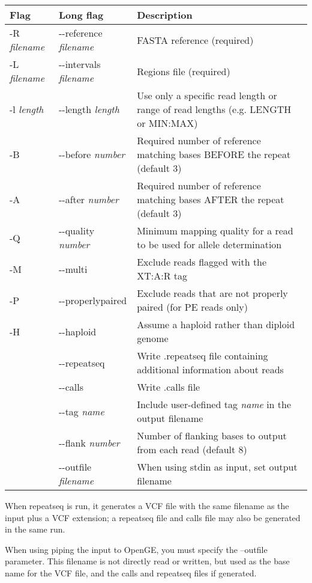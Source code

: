 \documentclass[11pt]{article}
\begin{document}
\begin{center}
\begin{tabular}{llp{3.5in}}
\hline
Flag&Long flag&Description\\ \hline
 -R \textit{filename}&{-}{-}reference \textit{filename}&FASTA reference (required)\\
 -L \textit{filename}&{-}{-}intervals \textit{filename}&Regions file (required)\\
 -l \textit{length}&{-}{-}length \textit{length}&Use only a specific read length or range of read lengths (e.g. LENGTH or MIN:MAX)\\
 -B&{-}{-}before \textit{number}&Required number of reference matching bases BEFORE the repeat (default 3)\\
 -A&{-}{-}after \textit{number}&Required number of reference matching bases AFTER the repeat (default 3)\\
 -Q&{-}{-}quality \textit{number}&Minimum mapping quality for a read to be used for allele determination\\
 -M&{-}{-}multi&Exclude reads flagged with the XT:A:R tag\\
 -P&{-}{-}properlypaired&Exclude reads that are not properly paired (for PE reads only)\\
 -H&{-}{-}haploid&Assume a haploid rather than diploid genome\\
 &{-}{-}repeatseq&Write .repeatseq file containing additional information about reads\\
 &{-}{-}calls&Write .calls file\\
 &{-}{-}tag \textit{name}&Include user-defined tag \textit{name} in the output filename\\
 &{-}{-}flank \textit{number}&Number of flanking bases to output from each read (default 8)\\
 &{-}{-}outfile \textit{filename}&When using stdin as input, set output filename\\
\end{tabular}
\end{center}

When repeatseq is run, it generates a VCF file with the same filename as the input plus a VCF extension; a repeatseq file and calls file may also be generated in the same run.

When using piping the input to OpenGE, you must specify the --outfile parameter. This filename is not directly read or written, but used as the base name for the VCF file, and the calls and repeatseq files if generated.
\end{document}
